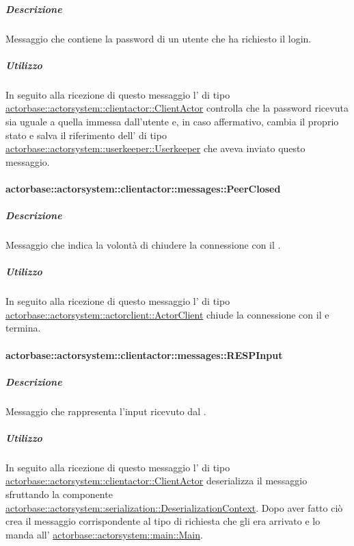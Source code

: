 \documentclass{scalatekids-article}
\begin{document}
\subparagraph{Descrizione}

Messaggio che contiene la password di un utente che ha richiesto il login.

\subparagraph{Utilizzo}

In seguito alla ricezione di questo messaggio l' di tipo
\hyperref[sec:actorbase::actorsystem::clientactor::ClientActor]{actorbase::\allowbreak{}actorsystem::\allowbreak{}clientactor::\allowbreak{}ClientActor}
controlla che la password ricevuta sia uguale a quella immessa
dall'utente e, in caso affermativo, cambia il proprio stato e salva
il riferimento dell' di tipo
\hyperref[sec:actorbase::actorsystem::userkeeper::Userkeeper]{actorbase::\allowbreak{}actorsystem::\allowbreak{}userkeeper::\allowbreak{}Userkeeper}
che aveva inviato questo messaggio.

\paragraph{actorbase::actorsystem::clientactor::messages::PeerClosed}
\label{sec:actorbase::actorsystem::clientactor::messages::PeerClosed}

\subparagraph{Descrizione}

Messaggio che indica la volontà di chiudere la connessione con il .

\subparagraph{Utilizzo}

In seguito alla ricezione di questo messaggio l' di tipo
\hyperref[sec:actorbase::actorsystem::actorclient::ActorClient]{actorbase::actorsystem::actorclient::ActorClient}
chiude la connessione con il  e termina.

\paragraph{actorbase::actorsystem::clientactor::messages::RESPInput}
\label{sec:actorbase::actorsystem::clientactor::messages::RESPInput}

\subparagraph{Descrizione}

Messaggio che rappresenta l'input ricevuto dal .

\subparagraph{Utilizzo}

In seguito alla ricezione di questo messaggio l' di tipo
\hyperref[sec:actorbase::actorsystem::clientactor::ClientActor]{actorbase::actorsystem::clientactor::ClientActor}
deserializza il messaggio sfruttando la componente
\hyperref[sec:actorbase::actorsystem::serialization::DeserializationContext]{actorbase::actorsystem::serialization::DeserializationContext}.
Dopo aver fatto ciò crea il messaggio corrispondente al tipo di richiesta che gli era arrivato
e lo manda all' \hyperref[sec:actorbase::actorsystem::main::Main]{actorbase::actorsystem::main::Main}.
\end{document}

